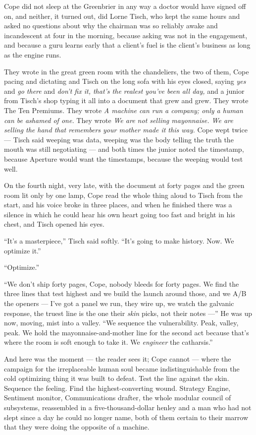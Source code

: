 \documentclass[11pt,openany]{book}
\begin{document}
Cope did not sleep at the Greenbrier in any way a doctor would have signed off on, and neither, it turned out, did Lorne Tisch, who kept the same hours and asked no questions about why the chairman was so reliably awake and incandescent at four in the morning, because asking was not in the engagement, and because a guru learns early that a client's fuel is the client's business as long as the engine runs.

They wrote in the great green room with the chandeliers, the two of them, Cope pacing and dictating and Tisch on the long sofa with his eyes closed, saying \textit{yes} and \textit{go there} and \textit{don't fix it, that's the realest you've been all day,} and a junior from Tisch's shop typing it all into a document that grew and grew. They wrote The Ten Premiums. They wrote \textit{A machine can run a company; only a human can be ashamed of one.} They wrote \textit{We are not selling mayonnaise. We are selling the hand that remembers your mother made it this way.} Cope wept twice --- Tisch said weeping was data, weeping was the body telling the truth the mouth was still negotiating --- and both times the junior noted the timestamp, because Aperture would want the timestamps, because the weeping would test well.

On the fourth night, very late, with the document at forty pages and the green room lit only by one lamp, Cope read the whole thing aloud to Tisch from the start, and his voice broke in three places, and when he finished there was a silence in which he could hear his own heart going too fast and bright in his chest, and Tisch opened his eyes.

``It's a masterpiece,'' Tisch said softly. ``It's going to make history. Now. We optimize it.''

``Optimize.''

``We don't ship forty pages, Cope, nobody bleeds for forty pages. We find the three lines that test highest and we build the launch around those, and we A/B the openers --- I've got a panel we run, they wire up, we watch the galvanic response, the truest line is the one their \textit{skin} picks, not their notes ---'' He was up now, moving, mist into a valley. ``We sequence the vulnerability. Peak, valley, peak. We hold the mayonnaise-and-mother line for the second act because that's where the room is soft enough to take it. We \textit{engineer} the catharsis.''

And here was the moment --- the reader sees it; Cope cannot --- where the campaign for the irreplaceable human soul became indistinguishable from the cold optimizing thing it was built to defeat. Test the line against the skin. Sequence the feeling. Find the highest-converting wound. Strategy Engine, Sentiment monitor, Communications drafter, the whole modular council of subsystems, reassembled in a five-thousand-dollar henley and a man who had not slept since a day he could no longer name, both of them certain to their marrow that they were doing the opposite of a machine.
\end{document}
